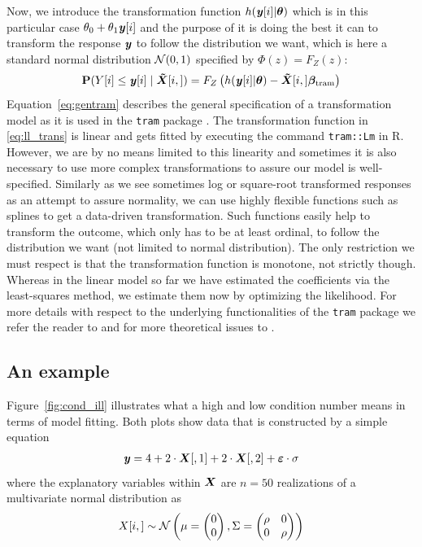 \documentclass[11pt,a4paper,twoside]{book}\usepackage[]{graphicx}\usepackage[]{xcolor}
\begin{document}
Now, we introduce the transformation function $h({\textbf{\textit{y}}}[i]|\boldsymbol{\theta})$ which is in this particular case $\theta_0+\theta_1 {\textbf{\textit{y}}}[i]$ and the purpose of it is doing the best it can to transform the response ${\textbf{\textit{y}}}$ to follow the distribution we want, which is here a standard normal distribution $\operatorname{\mathcal{N}}(0,1)$ specified by $\Phi(z)=F_Z(z)$:
\begin{align}
{\mathbf{P}}(Y[i]\leq {\textbf{\textit{y}}}[i]\mid\boldsymbol{\tilde X}[i,])=F_Z\left(h({\textbf{\textit{y}}}[i]|\boldsymbol{\theta})-\boldsymbol{\tilde X}[i,]\boldsymbol{\beta_{\text{tram}}} \right) \label{eq:gentram}
\end{align}
Equation~\eqref{eq:gentram} describes the general specification of a transformation model as it is used in the \texttt{tram} package \citep{Hothorn2020}. The transformation function in \eqref{eq:ll_trans} is linear and gets fitted by executing the command \texttt{tram::Lm} in \textsf{R}. However, we are by no means limited to this linearity and sometimes it is also necessary to use more complex transformations to assure our model is well-specified. Similarly as we see sometimes log or square-root transformed responses as an attempt to assure normality, we can use highly flexible functions such as splines to get a data-driven transformation. Such functions easily help to transform the outcome, which only has to be at least ordinal, to follow the distribution we want (not limited to normal distribution). The only restriction we must respect is that the transformation function is monotone, not strictly though. Whereas in the linear model so far we have estimated the coefficients via the least-squares method, we estimate them now by optimizing the likelihood. For more details with respect to the underlying functionalities of the \texttt{tram} package we refer the reader to \cite{Hothorn2020} and for more theoretical issues to \cite{Hothorn2017}.

\subsection{An example}\label{sec:example}



Figure~\ref{fig:cond_ill} illustrates what a high and low condition number means in terms of model fitting. Both plots show data that is constructed by a simple equation
\begin{align}
{\textbf{\textit{y}}}=4+2\cdot{\boldsymbol{X}}[,1]+2\cdot{\boldsymbol{X}}[,2]+\boldsymbol{\varepsilon}\cdot \sigma \label{eq:simplemodel}
\end{align}
where the explanatory variables within ${\boldsymbol{X}}$ are $n=50$ realizations of a multivariate normal distribution as 
$$X[i,]\sim\operatorname{\mathcal{N}}\left(\mu = \begin{pmatrix} 0 \\ 0 \end{pmatrix}, \Sigma = \begin{pmatrix} \rho & 0 \\ 0&\rho \end{pmatrix}\right)$$
\end{document}
